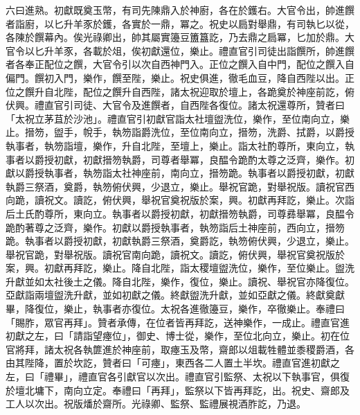 \begin{pinyinscope}
 六曰進熟。初獻既奠玉幣，有司先陳鼎入於神廚，各在於鑊右。大官令出，帥進饌者詣廚，以匕升羊豕於鑊，各實於一鼎，冪之。祝史以扃對舉鼎，有司執匕以從，各陳於饌幕內。俟光祿卿出，帥其屬實籩豆簠簋訖，乃去鼎之扃冪，匕加於鼎。大官令以匕升羊豕，各載於俎，俟初獻還位，樂止。禮直官引司徒出詣饌所，帥進饌者各奉正配位之饌，大官令引以次自西神門入。正位之饌入自中門，配位之饌入自偏門。饌初入門，樂作，饌至陛，樂止。祝史俱進，徹毛血豆，降自西陛以出。正位之饌升自北陛，配位之饌升自西陛，諸太祝迎取於壇上，各跪奠於神座前訖，俯伏興。禮直官引司徒、大官令及進饌者，自西陛各復位。諸太祝還尊所，贊者曰「太祝立茅苴於沙池」。禮直官引初獻官詣太社壇盥洗位，樂作，至位南向立，樂止。搢笏，盥手，帨手，執笏詣爵洗位，至位南向立，搢笏，洗爵、拭爵，以爵授執事者，執笏詣壇，樂作，升自北陛，至壇上，樂止。詣太社酌尊所，東向立，執事者以爵授初獻，初獻搢笏執爵，司尊者舉冪，良醖令跪酌太尊之泛齊，樂作。初獻以爵授執事者，執笏詣太社神座前，南向立，搢笏跪。執事者以爵授初獻，初獻執爵三祭酒，奠爵，執笏俯伏興，少退立，樂止。舉祝官跪，對舉祝版。讀祝官西向跪，讀祝文。讀訖，俯伏興，舉祝官奠祝版於案，興。初獻再拜訖，樂止。次詣后土氏酌尊所，東向立。執事者以爵授初獻，初獻搢笏執爵，司尊彞舉冪，良醖令跪酌著尊之泛齊，樂作。初獻以爵授執事者，執笏詣后土神座前，西向立，搢笏跪。執事者以爵授初獻，初獻執爵三祭酒，奠爵訖，執笏俯伏興，少退立，樂止。舉祝官跪，對舉祝版。讀祝官南向跪，讀祝文。讀訖，俯伏興，舉祝官奠祝版於案，興。初獻再拜訖，樂止。降自北陛，詣太稷壇盥洗位，樂作，至位樂止。盥洗升獻並如太社後土之儀。降自北陛，樂作，復位，樂止。讀祝、舉祝官亦降復位。亞獻詣兩壇盥洗升獻，並如初獻之儀。終獻盥洗升獻，並如亞獻之儀。終獻奠獻畢，降復位，樂止，執事者亦復位。太祝各進徹籩豆，樂作，卒徹樂止。奉禮曰「賜胙，眾官再拜」。贊者承傳，在位者皆再拜訖，送神樂作，一成止。禮直官進初獻之左，曰「請詣望瘞位」，御史、博士從，樂作，至位北向立，樂止。初在位官將拜，諸太祝各執篚進於神座前，取瘞玉及幣，齋郎以俎載牲體並黍稷爵酒，各由其陛降，置於坎訖，贊者曰「可瘞」，東西各二人置土半坎。禮直官進初獻之左，曰「禮畢」，禮直官各引獻官以次出。禮直官引監祭、太祝以下執事官，俱復於壇北墉下，南向立定。奉禮曰「再拜」，監祭以下皆再拜訖，出。祝史、齋郎及工人以次出。祝版燔於齋所。光祿卿、監祭、監禮展視酒胙訖，乃退。




\end{pinyinscope}

